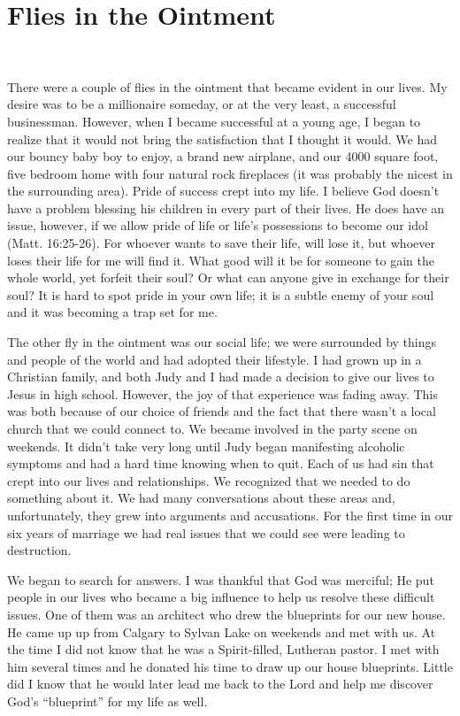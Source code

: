 \documentclass[oneside]{book}
\begin{document}
\section{Flies in the Ointment}
\

There were a couple of flies in the ointment that became evident in our lives. My desire was to be a millionaire someday, or at the very least, a successful businessman. However, when I became successful at a young age, I began to realize that it would not bring the satisfaction that I thought it would. We had our bouncy baby boy to enjoy, a brand new airplane, and our 4000 square foot, five bedroom home with four natural rock fireplaces (it was probably the nicest in the surrounding area).  Pride of success crept into my life. I believe God doesn't have a problem blessing his children in every part of their lives. He does have an issue, however, if we allow pride of life or life's possessions to become our idol (Matt. 16:25-26). For whoever wants to save their life, will lose it, but whoever loses their life for me will find it. What good will it be for someone to gain the whole world, yet forfeit their soul? Or what can anyone give in exchange for their soul? It is hard to spot pride in your own life; it is a subtle enemy of your soul and it was becoming a trap set for me.

The other fly in the ointment was our social life; we were surrounded by things and people of the world and had adopted their lifestyle. I had grown up in a Christian family, and both Judy and I had made a decision to give our lives to Jesus in high school. However, the joy of that experience was fading away. This was both because of our choice of friends and the fact that there wasn't a local church that we could connect to. We became involved in the party scene on weekends. It didn't take very long until Judy began manifesting alcoholic symptoms and had a hard time knowing when to quit. Each of us had sin that crept into our lives and relationships. We recognized that we needed to do something about it. We had many conversations about these areas and, unfortunately, they grew into arguments and accusations. For the first time in our six years of marriage we had real issues that we could see were leading to destruction.

We began to search for answers. I was thankful that God was merciful; He put people in our lives who became a big influence to help us resolve these difficult issues. One of them was an architect who drew the blueprints for our new house. He came up up from Calgary to Sylvan Lake on weekends and met with us. At the time I did not know that he was a Spirit-filled, Lutheran pastor. I met with him several times and he donated his time to draw up our house blueprints. Little did I know that he would later lead me back to the Lord and help me discover God's “blueprint” for my life as well.
\end{document}
